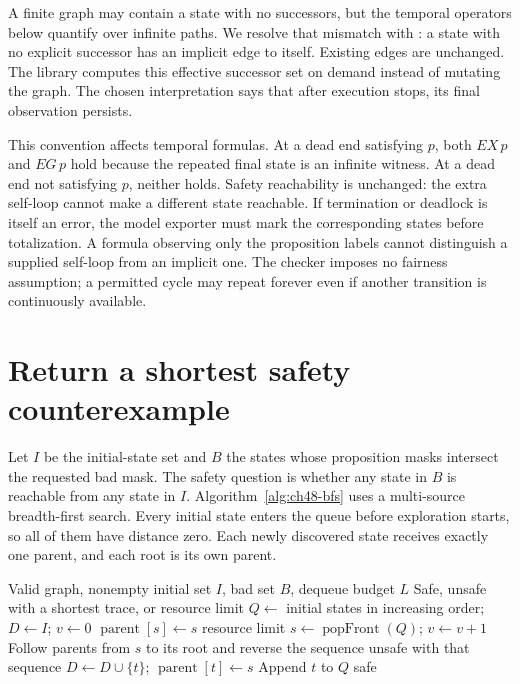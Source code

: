 A finite graph may contain a state with no successors, but the temporal operators below quantify over infinite paths.
We resolve that mismatch with : a state with no explicit successor has an implicit edge to itself.
Existing edges are unchanged.
The library computes this effective successor set on demand instead of mutating the graph.
The chosen interpretation says that after execution stops, its final observation persists.

This convention affects temporal formulas.
At a dead end satisfying $p$, both $EX\,p$ and $EG\,p$ hold because the repeated final state is an infinite witness.
At a dead end not satisfying $p$, neither holds.
Safety reachability is unchanged: the extra self-loop cannot make a different state reachable.
If termination or deadlock is itself an error, the model exporter must mark the corresponding states before totalization.
A formula observing only the proposition labels cannot distinguish a supplied self-loop from an implicit one.
The checker imposes no fairness assumption; a permitted cycle may repeat forever even if another transition is continuously available.

\section{Return a shortest safety counterexample}
\label{sec:ch48-bfs}

Let $I$ be the initial-state set and $B$ the states whose proposition masks intersect the requested bad mask.
The safety question is whether any state in $B$ is reachable from any state in $I$.
Algorithm~\ref{alg:ch48-bfs} uses a multi-source breadth-first search.
Every initial state enters the queue before exploration starts, so all of them have distance zero.
Each newly discovered state receives exactly one parent, and each root is its own parent.

\begin{algorithm}[htbp]
  \caption{Budgeted safety search with a replayable shortest trace.}
  \label{alg:ch48-bfs}
  \begin{pseudocode}
    \Require Valid graph, nonempty initial set $I$, bad set $B$, dequeue budget $L$
    \Ensure Safe, unsafe with a shortest trace, or resource limit
    \State $Q\gets$ initial states in increasing order; $D\gets I$; $v\gets0$
      \State $\operatorname{parent}[s]\gets s$
    \EndFor
        \State \Return resource limit
      \EndIf
      \State $s\gets\operatorname{popFront}(Q)$; $v\gets v+1$
        \State Follow parents from $s$ to its root and reverse the sequence
        \State \Return unsafe with that sequence
      \EndIf
          \State $D\gets D\cup\{t\}$; $\operatorname{parent}[t]\gets s$
          \State Append $t$ to $Q$
        \EndIf
      \EndFor
    \EndWhile
    \State \Return safe
  \end{pseudocode}
\end{algorithm}

